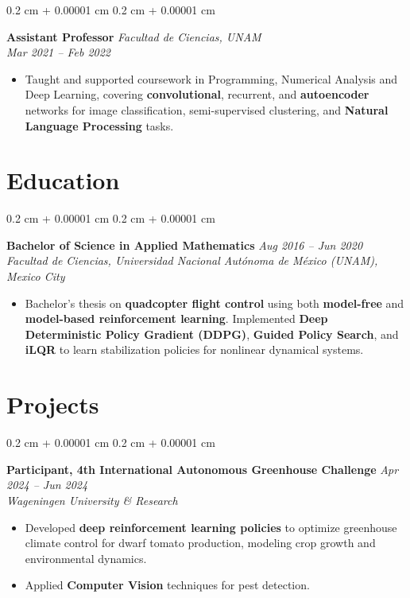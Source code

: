 \documentclass[10pt, letterpaper]{article}
\newenvironment{highlights}{
    \begin{itemize}[
        topsep=0.10 cm,
        parsep=0.10 cm,
        partopsep=0pt,
        itemsep=0pt,
        leftmargin=0.4 cm + 10pt
    ]
}{
    \end{itemize}
}
\newenvironment{onecolentry}{
    \begin{adjustwidth}{
        0.2 cm + 0.00001 cm
    }{
        0.2 cm + 0.00001 cm
    }
}{
    \end{adjustwidth}
}
\begin{document}
\begin{onecolentry}
\textbf{Assistant Professor} \hfill \textit{Facultad de Ciencias, UNAM} \\
\textit{Mar 2021 -- Feb 2022}
\begin{highlights}
    \item Taught and supported coursework in Programming, Numerical Analysis and Deep Learning, covering \textbf{convolutional}, recurrent, and \textbf{autoencoder} networks for image classification, semi-supervised clustering, and \textbf{Natural Language Processing} tasks.
\end{highlights}
\end{onecolentry}

\section{Education}

\begin{onecolentry}
\textbf{Bachelor of Science in Applied Mathematics} \hfill \textit{Aug 2016 -- Jun 2020} \\
\textit{Facultad de Ciencias, Universidad Nacional Autónoma de México (UNAM), Mexico City}
\begin{highlights}
    \item Bachelor's thesis on \textbf{quadcopter flight control} using both \textbf{model-free} and \textbf{model-based reinforcement learning}. Implemented \textbf{Deep Deterministic Policy Gradient (DDPG)}, \textbf{Guided Policy Search}, and \textbf{iLQR} to learn stabilization policies for nonlinear dynamical systems.
\end{highlights}
\end{onecolentry}

\section{Projects}

\begin{onecolentry}
\textbf{Participant, 4th International Autonomous Greenhouse Challenge} \hfill \textit{Apr 2024 -- Jun 2024} \\
\textit{Wageningen University \& Research}
\begin{highlights}
    \item Developed \textbf{deep reinforcement learning policies} to optimize greenhouse climate control for dwarf tomato production, modeling crop growth and environmental dynamics.
    \item Applied \textbf{Computer Vision} techniques for pest detection.
\end{highlights}
\end{onecolentry}
\end{document}
